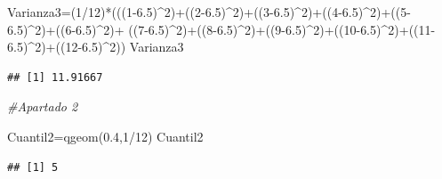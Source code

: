 \documentclass[
]{article}
\newenvironment{Shaded}{\begin{snugshade}}{\end{snugshade}}
\newcommand{\CommentTok}[1]{\textcolor[rgb]{0.56,0.35,0.01}{\textit{#1}}}
\newcommand{\DecValTok}[1]{\textcolor[rgb]{0.00,0.00,0.81}{#1}}
\newcommand{\FloatTok}[1]{\textcolor[rgb]{0.00,0.00,0.81}{#1}}
\newcommand{\FunctionTok}[1]{\textcolor[rgb]{0.00,0.00,0.00}{#1}}
\newcommand{\NormalTok}[1]{#1}
\newcommand{\OtherTok}[1]{\textcolor[rgb]{0.56,0.35,0.01}{#1}}
\newcommand{\SpecialCharTok}[1]{\textcolor[rgb]{0.00,0.00,0.00}{#1}}
\begin{document}
\begin{Shaded}
\begin{Highlighting}[]
\NormalTok{Varianza3}\OtherTok{=}\NormalTok{(}\DecValTok{1}\SpecialCharTok{/}\DecValTok{12}\NormalTok{)}\SpecialCharTok{*}\NormalTok{(((}\DecValTok{1}\FloatTok{{-}6.5}\NormalTok{)}\SpecialCharTok{\^{}}\DecValTok{2}\NormalTok{)}\SpecialCharTok{+}\NormalTok{((}\DecValTok{2}\FloatTok{{-}6.5}\NormalTok{)}\SpecialCharTok{\^{}}\DecValTok{2}\NormalTok{)}\SpecialCharTok{+}\NormalTok{((}\DecValTok{3}\FloatTok{{-}6.5}\NormalTok{)}\SpecialCharTok{\^{}}\DecValTok{2}\NormalTok{)}\SpecialCharTok{+}\NormalTok{((}\DecValTok{4}\FloatTok{{-}6.5}\NormalTok{)}\SpecialCharTok{\^{}}\DecValTok{2}\NormalTok{)}\SpecialCharTok{+}\NormalTok{((}\DecValTok{5}\FloatTok{{-}6.5}\NormalTok{)}\SpecialCharTok{\^{}}\DecValTok{2}\NormalTok{)}\SpecialCharTok{+}\NormalTok{((}\DecValTok{6}\FloatTok{{-}6.5}\NormalTok{)}\SpecialCharTok{\^{}}\DecValTok{2}\NormalTok{)}\SpecialCharTok{+}
\NormalTok{                    ((}\DecValTok{7}\FloatTok{{-}6.5}\NormalTok{)}\SpecialCharTok{\^{}}\DecValTok{2}\NormalTok{)}\SpecialCharTok{+}\NormalTok{((}\DecValTok{8}\FloatTok{{-}6.5}\NormalTok{)}\SpecialCharTok{\^{}}\DecValTok{2}\NormalTok{)}\SpecialCharTok{+}\NormalTok{((}\DecValTok{9}\FloatTok{{-}6.5}\NormalTok{)}\SpecialCharTok{\^{}}\DecValTok{2}\NormalTok{)}\SpecialCharTok{+}\NormalTok{((}\DecValTok{10}\FloatTok{{-}6.5}\NormalTok{)}\SpecialCharTok{\^{}}\DecValTok{2}\NormalTok{)}\SpecialCharTok{+}\NormalTok{((}\DecValTok{11}\FloatTok{{-}6.5}\NormalTok{)}\SpecialCharTok{\^{}}\DecValTok{2}\NormalTok{)}\SpecialCharTok{+}\NormalTok{((}\DecValTok{12}\FloatTok{{-}6.5}\NormalTok{)}\SpecialCharTok{\^{}}\DecValTok{2}\NormalTok{))}
\NormalTok{Varianza3}
\end{Highlighting}
\end{Shaded}

\begin{verbatim}
## [1] 11.91667
\end{verbatim}

\begin{Shaded}
\begin{Highlighting}[]
\CommentTok{\#Apartado 2}

\NormalTok{Cuantil2}\OtherTok{=}\FunctionTok{qgeom}\NormalTok{(}\FloatTok{0.4}\NormalTok{,}\DecValTok{1}\SpecialCharTok{/}\DecValTok{12}\NormalTok{)}
\NormalTok{Cuantil2}
\end{Highlighting}
\end{Shaded}

\begin{verbatim}
## [1] 5
\end{verbatim}
\end{document}
